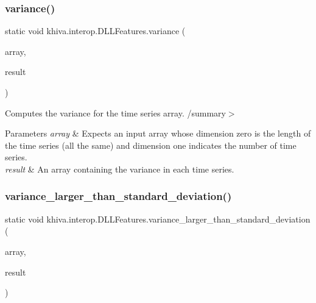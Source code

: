 \mbox{\label{classkhiva_1_1interop_1_1_d_l_l_features_ac4b7f5fc3d28280df33109144eda6f8a}} 
\subsubsection{\texorpdfstring{variance()}{variance()}}
{\footnotesize\ttfamily static void khiva.\+interop.\+D\+L\+L\+Features.\+variance (\begin{DoxyParamCaption}\item[{\mbox{[}\+In\mbox{]} ref Int\+Ptr}]{array,  }\item[{\mbox{[}\+Out\mbox{]} out Int\+Ptr}]{result }\end{DoxyParamCaption})\hspace{0.3cm}{\ttfamily [static]}}



Computes the variance for the time series array. /summary$>$ 
\begin{DoxyParams}{Parameters}
{\em array} & Expects an input array whose dimension zero is the length of the time series (all the same) and dimension one indicates the number of time series.\\
\hline
{\em result} & An array containing the variance in each time series.\\
\hline
\end{DoxyParams}


\mbox{\label{classkhiva_1_1interop_1_1_d_l_l_features_a467faca41be774c30029d492d73e1a8f}} 
\subsubsection{\texorpdfstring{variance\+\_\+larger\+\_\+than\+\_\+standard\+\_\+deviation()}{variance\_larger\_than\_standard\_deviation()}}
{\footnotesize\ttfamily static void khiva.\+interop.\+D\+L\+L\+Features.\+variance\+\_\+larger\+\_\+than\+\_\+standard\+\_\+deviation (\begin{DoxyParamCaption}\item[{\mbox{[}\+In\mbox{]} ref Int\+Ptr}]{array,  }\item[{\mbox{[}\+Out\mbox{]} out Int\+Ptr}]{result }\end{DoxyParamCaption})\hspace{0.3cm}{\ttfamily [static]}}



